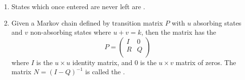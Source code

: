 \documentclass[12pt]{article}
\begin{document}
\begin{enumerate}
    \item
        States which once entered are never left are .
    \item
        Given a Markov chain defined by transition matrix \( P \) with \(
        u \) absorbing states and \( v \) non-absorbing states where \(
        u + v = k \), then the matrix has the 
        \[
            P=
            \begin{pmatrix}
                I & 0 \\
                R & Q \\
            \end{pmatrix}
        \] where \( I \) is the \( u\times u \) identity matrix, and \(
        0 \) is the \( u\times v \) matrix of zeros.  The matrix \( N=(I-Q)^
        {-1} \) is called the .
\end{enumerate}
\end{document}
